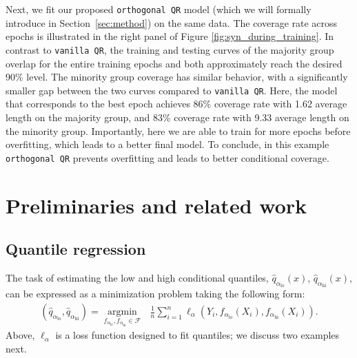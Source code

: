 \documentclass{article}
\begin{document}
Next, we fit our proposed \texttt{orthogonal QR} model (which we will formally introduce in Section~\ref{sec:method}) on the same data. The coverage rate across epochs is illustrated in the right panel of Figure \ref{fig:syn_during_training}. In contrast to \texttt{vanilla QR}, the training and testing curves of the majority group overlap for the entire training epochs and both approximately reach the desired 90\% level. The minority group coverage has similar behavior, with a significantly smaller gap between the two curves compared to \texttt{vanilla QR}. Here, the model that corresponds to the best epoch achieves 86\% coverage rate with 1.62 average length on the majority group, and 83\% coverage rate with 9.33 average length on the minority group. Importantly, here we are able to train for more epochs before overfitting, which leads to a better final model.
To conclude, in this example \texttt{orthogonal QR} prevents overfitting and leads to better conditional coverage.


\section{Preliminaries and related work}
\label{sec:related_work}

\subsection{Quantile regression}\label{quantile_regression_section}



The task of estimating the low and high conditional quantiles, $\hat{q}_{\alpha_{\textrm{lo}}}(x)$, $ \hat{q}_{\alpha_{\textrm{hi}}}(x)$, can be expressed as a minimization problem taking the following form:
\begin{equation}\label{quantile_regression_optimization}
\begin{gathered}
(\hat{q}_{\alpha_{\textrm{lo}}}, \hat{q}_{\alpha_{\textrm{hi}}}) = \operatorname*{argmin}_{f_{\alpha_{\textrm{lo}}}, f_{\alpha_{\textrm{hi}}} \in \mathcal{F}} \ \ \ {\frac{1}{n}{\sum_{i=1}^{n} {\ell_{\alpha}(Y_i,f_{\alpha_{\textrm{lo}}}(X_i), f_{\alpha_{\textrm{hi}}}(X_i))}}}.
\end{gathered}
\end{equation}
Above, $\ell_\alpha$ is a loss function designed to fit quantiles; we  discuss two examples next.
\end{document}

